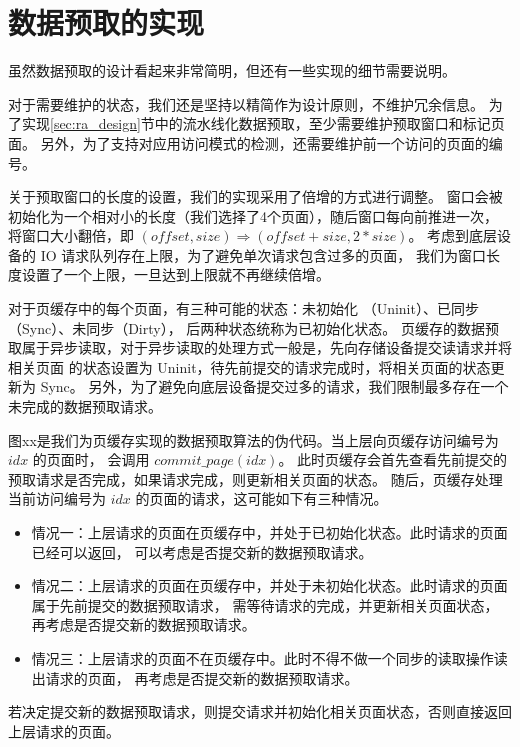 \section{数据预取的实现}
虽然数据预取的设计看起来非常简明，但还有一些实现的细节需要说明。

对于需要维护的状态，我们还是坚持以精简作为设计原则，不维护冗余信息。
为了实现\ref{sec:ra_design}节中的流水线化数据预取，至少需要维护预取窗口和标记页面。
另外，为了支持对应用访问模式的检测，还需要维护前一个访问的页面的编号。

关于预取窗口的长度的设置，我们的实现采用了倍增的方式进行调整。
窗口会被初始化为一个相对小的长度（我们选择了4个页面），随后窗口每向前推进一次，
将窗口大小翻倍，即 $ (offset, size) \Rightarrow (offset + size, 2*size) $。
考虑到底层设备的 IO 请求队列存在上限，为了避免单次请求包含过多的页面，
我们为窗口长度设置了一个上限，一旦达到上限就不再继续倍增。

对于页缓存中的每个页面，有三种可能的状态：未初始化 （Uninit）、已同步 （Sync）、未同步（Dirty），
后两种状态统称为已初始化状态。
页缓存的数据预取属于异步读取，对于异步读取的处理方式一般是，先向存储设备提交读请求并将相关页面
的状态设置为 Uninit，待先前提交的请求完成时，将相关页面的状态更新为 Sync。
另外，为了避免向底层设备提交过多的请求，我们限制最多存在一个未完成的数据预取请求。

图xx是我们为页缓存实现的数据预取算法的伪代码。当上层向页缓存访问编号为 $ idx $ 的页面时，
会调用 $ commit\_page(idx) $。
此时页缓存会首先查看先前提交的预取请求是否完成，如果请求完成，则更新相关页面的状态。
随后，页缓存处理当前访问编号为 $ idx $ 的页面的请求，这可能如下有三种情况。
\begin{itemize}
    \item 情况一：上层请求的页面在页缓存中，并处于已初始化状态。此时请求的页面已经可以返回，
    可以考虑是否提交新的数据预取请求。
    \item 情况二：上层请求的页面在页缓存中，并处于未初始化状态。此时请求的页面属于先前提交的数据预取请求，
    需等待请求的完成，并更新相关页面状态，再考虑是否提交新的数据预取请求。
    \item 情况三：上层请求的页面不在页缓存中。此时不得不做一个同步的读取操作读出请求的页面，
    再考虑是否提交新的数据预取请求。
\end{itemize}
若决定提交新的数据预取请求，则提交请求并初始化相关页面状态，否则直接返回上层请求的页面。


